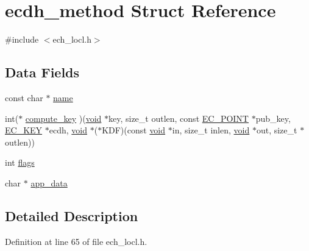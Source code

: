 \hypertarget{structecdh__method}{}\section{ecdh\+\_\+method Struct Reference}
\label{structecdh__method}


{\ttfamily \#include $<$ech\+\_\+locl.\+h$>$}

\subsection*{Data Fields}
\begin{DoxyCompactItemize}
\item 
const char $\ast$ \hyperlink{structecdh__method_a8f8f80d37794cde9472343e4487ba3eb}{name}
\item 
int($\ast$ \hyperlink{structecdh__method_af9b1fdf248d51d0c8d3dcf340430e4f0}{compute\+\_\+key} )(\hyperlink{hw__4758__cca_8h_afad4d591c7931ff6dc5bf69c76c96aa0}{void} $\ast$key, size\+\_\+t outlen, const \hyperlink{crypto_2ec_2ec_8h_ab372a34de16c42eb0ccfa63be0ad985f}{E\+C\+\_\+\+P\+O\+I\+NT} $\ast$pub\+\_\+key, \hyperlink{crypto_2ec_2ec_8h_a756878ae60b2fc17d4217e77ffe5e0d3}{E\+C\+\_\+\+K\+EY} $\ast$ecdh, \hyperlink{hw__4758__cca_8h_afad4d591c7931ff6dc5bf69c76c96aa0}{void} $\ast$($\ast$K\+DF)(const \hyperlink{hw__4758__cca_8h_afad4d591c7931ff6dc5bf69c76c96aa0}{void} $\ast$in,                                                                                                                                                                                                       size\+\_\+t inlen, \hyperlink{hw__4758__cca_8h_afad4d591c7931ff6dc5bf69c76c96aa0}{void} $\ast$out,                                                                                                                                                                                                       size\+\_\+t $\ast$outlen))
\item 
int \hyperlink{structecdh__method_ac8bf36fe0577cba66bccda3a6f7e80a4}{flags}
\item 
char $\ast$ \hyperlink{structecdh__method_ae2a89f832bf7b6b967e9c3d590e65f83}{app\+\_\+data}
\end{DoxyCompactItemize}


\subsection{Detailed Description}


Definition at line 65 of file ech\+\_\+locl.\+h.



